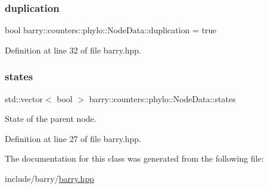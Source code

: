 \subsubsection{\texorpdfstring{duplication}{duplication}}
{\footnotesize\ttfamily bool barry\+::counters\+::phylo\+::\+Node\+Data\+::duplication = true}



Definition at line 32 of file barry.\+hpp.

\mbox{\label{classbarry_1_1counters_1_1phylo_1_1_node_data_a9a88332b03b6c78f386a1fafac660052}} 
\subsubsection{\texorpdfstring{states}{states}}
{\footnotesize\ttfamily std\+::vector$<$ bool $>$ barry\+::counters\+::phylo\+::\+Node\+Data\+::states}

State of the parent node. 

Definition at line 27 of file barry.\+hpp.



The documentation for this class was generated from the following file\+:\begin{DoxyCompactItemize}
\item 
include/barry/\hyperlink{barry_8hpp}{barry.\+hpp}\end{DoxyCompactItemize}
